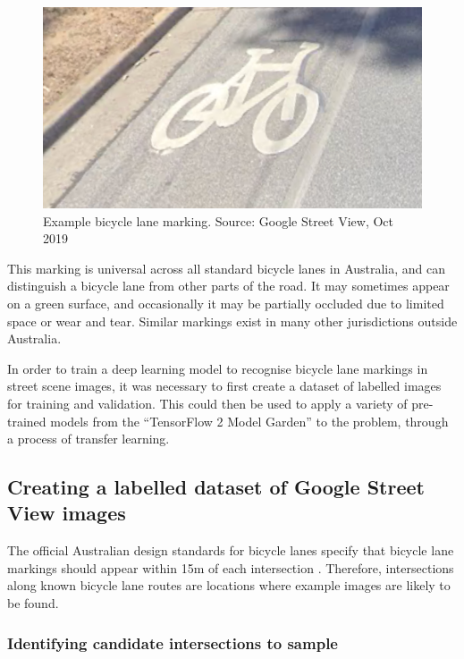\documentclass[11pt,twoside]{report}
\begin{document}
\begin{figure}[h]
\centering
\includegraphics[scale=0.60]{f001_symbol.png}
\caption{Example bicycle lane marking.  Source: Google Street View, Oct 2019}
\label{fig:symbol}
\end{figure}

This marking is universal across all standard bicycle lanes in Australia, and can distinguish a bicycle lane from other parts of the road.  It may sometimes appear on a green surface, and occasionally it may be partially occluded due to limited space or wear and tear.  Similar markings exist in many other jurisdictions outside Australia.

In order to train a deep learning model to recognise bicycle lane markings in street scene images, it was necessary to first create a dataset of labelled images for training and validation.  This could then be used to apply a variety of pre-trained models from the ``TensorFlow 2 Model Garden'' to the problem, through a process of transfer learning.

\subsection{Creating a labelled dataset of Google Street View images}

The official Australian design standards for bicycle lanes specify that bicycle lane markings should appear within 15m of each intersection \cite{standards}.  Therefore, intersections along known bicycle lane routes are locations where example images are likely to be found.

\subsubsection{Identifying candidate intersections to sample}
\label{s:sample_candidates}
\end{document}
